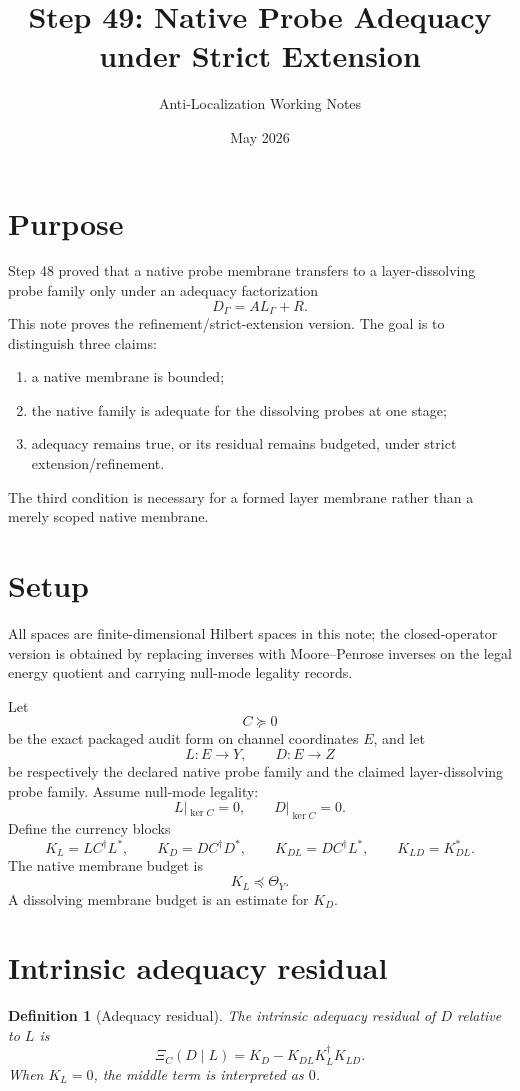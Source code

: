 \documentclass[11pt]{article}
\title{Step 49: Native Probe Adequacy under Strict Extension}
\author{Anti-Localization Working Notes}
\date{May 2026}
\newtheorem{definition}{Definition}
\begin{document}
\maketitle

\section{Purpose}
Step 48 proved that a native probe membrane transfers to a layer-dissolving probe family only under an adequacy factorization
\[
D_\Gamma = A L_\Gamma + R.
\]
This note proves the refinement/strict-extension version.  The goal is to distinguish three claims:
\begin{enumerate}[label=(\roman*)]
\item a native membrane is bounded;
\item the native family is adequate for the dissolving probes at one stage;
\item adequacy remains true, or its residual remains budgeted, under strict extension/refinement.
\end{enumerate}
The third condition is necessary for a formed layer membrane rather than a merely scoped native membrane.

\section{Setup}
All spaces are finite-dimensional Hilbert spaces in this note; the closed-operator version is obtained by replacing inverses with Moore--Penrose inverses on the legal energy quotient and carrying null-mode legality records.

Let
\[
C\succeq0
\]
be the exact packaged audit form on channel coordinates $E$, and let
\[
L:E\to Y,\qquad D:E\to Z
\]
be respectively the declared native probe family and the claimed layer-dissolving probe family.  Assume null-mode legality:
\[
L|_{\ker C}=0,
\qquad
D|_{\ker C}=0.
\]
Define the currency blocks
\[
K_L = L C^\dagger L^*,
\qquad
K_D = D C^\dagger D^*,
\qquad
K_{DL}=D C^\dagger L^*,
\qquad
K_{LD}=K_{DL}^*.
\]
The native membrane budget is
\[
K_L\preceq \Theta_Y.
\]
A dissolving membrane budget is an estimate for $K_D$.

\section{Intrinsic adequacy residual}
\begin{definition}[Adequacy residual]
The intrinsic adequacy residual of $D$ relative to $L$ is
\[
\Xi_C(D\mid L)
=
K_D-K_{DL}K_L^\dagger K_{LD}.
\]
When $K_L=0$, the middle term is interpreted as $0$.
\end{definition}
\end{document}
